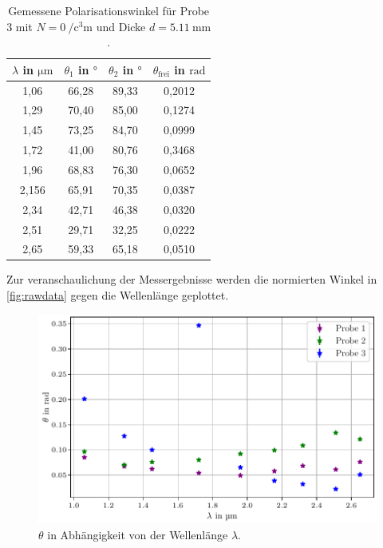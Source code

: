 \begin{table}[H]
    \centering
    \caption{Gemessene Polarisationswinkel für Probe 3 mit $N = \qty{0}{\per\cubic\centi\meter}$ und Dicke $d = \qty{5.11}{\milli\meter}$.}
    \label{tab:probe3}
    \begin{tabular}{c c c c}
        \toprule
        {$\lambda$ in $\si{\micro\meter}$} & {$\theta_1$ in $\si{\degree}$} & {$\theta_2$ in $\si{\degree}$} & {$\theta_\text{frei}$ in $\si{\radian}$} \\
        \midrule
        1,06  & 66,28 & 89,33 & 0,2012 \\
        1,29  & 70,40 & 85,00 & 0,1274 \\
        1,45  & 73,25 & 84,70 & 0,0999 \\
        1,72  & 41,00 & 80,76 & 0,3468 \\
        1,96  & 68,83 & 76,30 & 0,0652 \\
        2,156 & 65,91 & 70,35 & 0,0387  \\
        2,34  & 42,71 & 46,38 & 0,0320 \\
        2,51  & 29,71 & 32,25 & 0,0222 \\
        2,65  & 59,33 & 65,18 & 0,0510 \\   
        \bottomrule
    \end{tabular}
\end{table}
Zur veranschaulichung der Messergebnisse werden die normierten Winkel in \autoref{fig:rawdata} gegen die Wellenlänge geplottet.
\begin{figure}
    \centering
    \includegraphics[width=\textwidth]{plots/raw_data.pdf}
    \caption{$\theta$ in Abhängigkeit von der Wellenlänge $\lambda$.}
    \label{fig:rawdata}
\end{figure}


